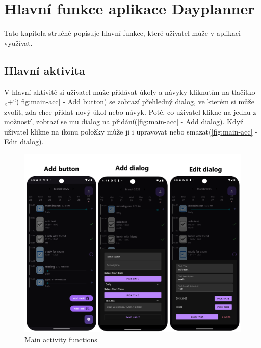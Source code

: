 \chapter{Hlavní funkce aplikace Dayplanner}  
\hspace{14pt} Tato kapitola stručně popisuje hlavní funkce, které uživatel může v aplikaci využívat.  

\section{Hlavní aktivita}  
\hspace{14pt} V hlavní aktivitě si uživatel může přidávat úkoly a návyky kliknutím na tlačítko „+“(\autoref{fig:main-acc} - Add button) se zobrazí přehledný dialog, ve kterém si může zvolit, zda chce přidat nový úkol nebo návyk. Poté, co uživatel klikne na jednu z možností, zobrazí se mu dialog na přidání(\autoref{fig:main-acc} - Add dialog). Když uživatel klikne na ikonu položky může ji i upravovat nebo smazat(\autoref{fig:main-acc} - Edit dialog).

\begin{figure}[H]
    \centering
    \includegraphics[width=1\linewidth]{images/nice.png}
    \caption{Main activity functions}
    \label{fig:main-acc}
\end{figure}

\newpage

